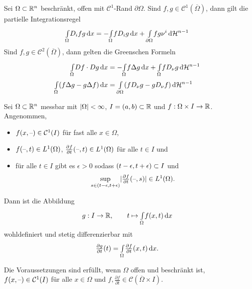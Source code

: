 \documentclass{cheat-sheet}
\newcommand{\HM}{\mathcal{H}} %
\begin{document}
\begin{kor}
  Sei $\Omega \subset \mathbb{R}^n$ beschränkt, offen mit $\mathcal{C}^1$-Rand $\partial \Omega$. Sind $f, g \in \mathcal{C}^1(\overline{\Omega})$, dann gilt die partielle Integrationsregel
  \[ \Int{\Omega}{}{D_i f g}{x} = - \Int{\Omega}{}{f D_i g}{x} + \Int{\partial \Omega}{}{f g \nu^i}{\HM^{n-1}} \]
  Sind $f, g \in \mathcal{C}^2(\overline{\Omega})$, dann gelten die Greenschen Formeln
  \begin{align*}
    \Int{\Omega}{}{Df \cdot Dg}{x} &= - \Int{\Omega}{}{f \Delta g}{x} + \Int{\Omega}{}{f D_{\nu} g}{\HM^{n-1}}\\
    \Int{\Omega}{}{(f \Delta g - g \Delta f)}{x} &= \Int{\partial \Omega}{}{(f D_{\nu} g - g D_{\nu} f)}{\HM^{n-1}}
  \end{align*}
\end{kor}

\begin{prop}
  Sei $\Omega \subset \mathbb{R}^n$ messbar mit $\lvert\Omega\rvert < \infty$, $I = \left( a, b \right) \subset \mathbb{R}$ und $f : \Omega \times I \to \mathbb{R}$. Angenommen,
  \begin{itemize}
    \item $f(x, \text{--}) \in \mathcal{C}^1(I)$ für fast alle $x \in \Omega$,
    \item $f(\text{--}, t) \in L^1(\Omega)$, $\tfrac{\partial f}{\partial t}(\text{--}, t) \in L^1(\Omega)$ für alle $t \in I$ und
    \item für alle $t \in I$ gibt es $\epsilon > 0$ sodass $\left( t-\epsilon, t+\epsilon \right) \subset I$ und
    \[ \sup_{s \in \left( t-\epsilon, t+\epsilon \right)} \lvert\tfrac{\partial f}{\partial t}(\text{--}, s)\rvert \in L^1(\Omega). \]
  \end{itemize}
  Dann ist die Abbildung
  \[
    g : I \to \mathbb{R}, \qquad
    t \mapsto {\textstyle \int\limits_{\Omega}^{}} f(x, t) \,\mathrm{d} x
  \]
  wohldefiniert und stetig differenzierbar mit
  \[ \tfrac{\partial g}{\partial t}(t) = {\textstyle \int\limits_{\Omega}^{}} \tfrac{\partial f}{\partial t}(x,t) \,\mathrm{d} x. \]
\end{prop}

\begin{bem}
  Die Voraussetzungen sind erfüllt, wenn $\Omega$ offen und beschränkt ist, $f(x, \text{--}) \in \mathcal{C}^1(I)$ für alle $x \in \Omega$ und $f, \tfrac{\partial f}{\partial t} \in \mathcal{C}(\overline{\Omega} \times I)$.
\end{bem}
\end{document}

